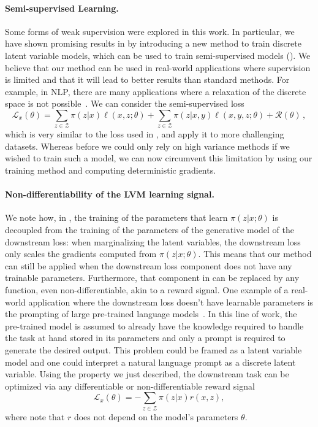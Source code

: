 \paragraph*{Semi-supervised Learning.} Some forms of weak
supervision were explored in this work. In particular, we have shown
promising results in  by introducing a new
method to train discrete latent variable models, which can be used to
train semi-supervised models (). We believe that our
method can be used in real-world applications where supervision is
limited and that it will lead to better results than standard
methods. For example, in NLP, there are many applications where a
relaxation of the discrete space is not possible~\citep{Lee2019}.
We can consider the semi-supervised loss
%
\begin{equation}
    \mathcal{L}_{x}(\theta) =
    \sum_{z \in \mathcal{Z}} \pi(z | x) \ell(x, z; \theta)
    + \sum_{z \in \mathcal{Z}} \pi(z | x, y) \ell(x, y, z; \theta)
    + \mathcal{R}(\theta)\,,
\end{equation}
%
which is very similar to the loss used in ,
and apply it to more challenging datasets.
Whereas before we could only rely on high variance methods if we wished to
train such a model, we can now circumvent this limitation
by using our training method and computing deterministic gradients.


\paragraph*{Non-differentiability of the LVM learning signal.} We
note how, in , the training of the parameters that
learn $\pi(z|x;\theta)$ is decoupled from the training of the
parameters of the generative model of the downstream loss: when
marginalizing the latent variables, the downstream loss only scales
the gradients computed from $\pi(z|x;\theta)$. This means that our
method can still be applied when the downstream loss component does
not have any trainable parameters. Furthermore, that component in
 can be replaced by any function, even
non-differentiable, akin to a reward signal. One example of a
real-world application where the downstream loss doesn't have
learnable parameters is the prompting of large pre-trained language
models~\citep{liu2021PretrainPromptPredict}. In this line of work,
the pre-trained model is assumed to already have the knowledge
required to handle the task at hand stored in its parameters and only
a prompt is required to generate the desired output. This problem
could be framed as a latent variable model and one could interpret a
natural language prompt as a discrete latent variable. Using the
property we just described, the downstream task can be optimized via
any differentiable or non-differentiable reward signal
%
\begin{equation}
    \mathcal{L}_{x}(\theta) =
    - \sum_{z \in \mathcal{Z}} \pi(z | x) r(x, z),
\end{equation}
%
where note that $r$ does not depend on the model's parameters $\theta$.

